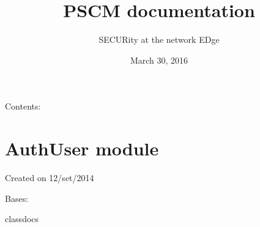 \documentclass[letterpaper,10pt,oneside]{sphinxmanual}
\title{PSCM documentation}
\date{March 30, 2016}
\author{SECURity at the network EDge}
\begin{document}
\maketitle
\tableofcontents
{}\label{index::doc}


Contents:


\chapter{AuthUser module}
\label{AuthUser:authuser-module}\label{AuthUser::doc}\label{AuthUser:module-AuthUser}\label{AuthUser:welcome-to-pscm-s-documentation}
Created on 12/set/2014

\begin{fulllineitems}
\label{AuthUser:AuthUser.Authenticate}
Bases: 

classdocs

\begin{fulllineitems}
\label{AuthUser:AuthUser.Authenticate.get_client_address}
\end{fulllineitems}


\begin{fulllineitems}
\label{AuthUser:AuthUser.Authenticate.on_delete}
\end{fulllineitems}


\begin{fulllineitems}
\label{AuthUser:AuthUser.Authenticate.on_get}
\end{fulllineitems}


\begin{fulllineitems}
\label{AuthUser:AuthUser.Authenticate.on_post}
\end{fulllineitems}


\end{fulllineitems}
\end{document}
